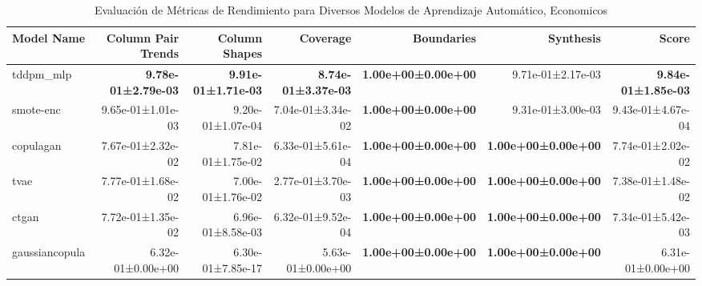 \begin{table}[H]
\centering
\fontsize{7}{14}\selectfont
\caption{Evaluaci\'on de M\'etricas de Rendimiento para Diversos Modelos de Aprendizaje Autom\'atico, Economicos}
\label{table-score-economicos-b}
\begin{tabular}{|l|r|r|r|r|r|r|}
\hline
\rowcolor[gray]{0.8}
Model Name & Column Pair Trends & Column Shapes & Coverage & Boundaries & Synthesis & \textbf{Score} \\
\hline tddpm\_mlp & \bfseries 9.78e-01±2.79e-03 & \bfseries 9.91e-01±1.71e-03 & \bfseries 8.74e-01±3.37e-03 & \bfseries 1.00e+00±0.00e+00 & 9.71e-01±2.17e-03 & \bfseries 9.84e-01±1.85e-03 \\
\hline smote-enc & 9.65e-01±1.01e-03 & 9.20e-01±1.07e-04 & 7.04e-01±3.34e-02 & \bfseries 1.00e+00±0.00e+00 & 9.31e-01±3.00e-03 & 9.43e-01±4.67e-04 \\
\hline copulagan & 7.67e-01±2.32e-02 & 7.81e-01±1.75e-02 & 6.33e-01±5.61e-04 & \bfseries 1.00e+00±0.00e+00 & \bfseries 1.00e+00±0.00e+00 & 7.74e-01±2.02e-02 \\
\hline tvae & 7.77e-01±1.68e-02 & 7.00e-01±1.76e-02 & 2.77e-01±3.70e-03 & \bfseries 1.00e+00±0.00e+00 & \bfseries 1.00e+00±0.00e+00 & 7.38e-01±1.48e-02 \\
\hline ctgan & 7.72e-01±1.35e-02 & 6.96e-01±8.58e-03 & 6.32e-01±9.52e-04 & \bfseries 1.00e+00±0.00e+00 & \bfseries 1.00e+00±0.00e+00 & 7.34e-01±5.42e-03 \\
\hline gaussiancopula & 6.32e-01±0.00e+00 & 6.30e-01±7.85e-17 & 5.63e-01±0.00e+00 & \bfseries 1.00e+00±0.00e+00 & \bfseries 1.00e+00±0.00e+00 & 6.31e-01±0.00e+00 \\
\hline
\end{tabular}
\end{table}
